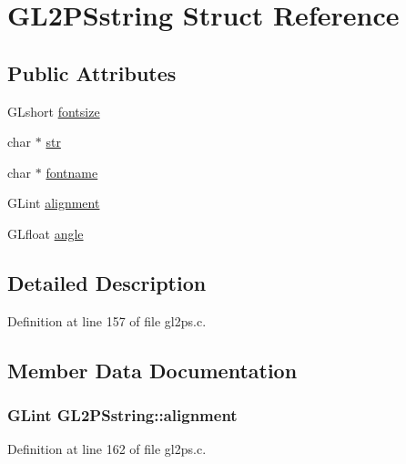 \hypertarget{struct_g_l2_p_sstring}{}\section{G\+L2\+P\+Sstring Struct Reference}
\label{struct_g_l2_p_sstring}
\subsection*{Public Attributes}
\begin{DoxyCompactItemize}
\item 
G\+Lshort \hyperlink{struct_g_l2_p_sstring_af7aa09890103ff15ddca41dd82b29b75}{fontsize}
\item 
char $\ast$ \hyperlink{struct_g_l2_p_sstring_ab4834e08f2449e695293efb4c4c9b5d2}{str}
\item 
char $\ast$ \hyperlink{struct_g_l2_p_sstring_a7afa2bce0363ec705d57e7fd4845b292}{fontname}
\item 
G\+Lint \hyperlink{struct_g_l2_p_sstring_a7fffe9c7f864eb511a381a2c8aa49fa0}{alignment}
\item 
G\+Lfloat \hyperlink{struct_g_l2_p_sstring_ac9c1f14e619dd358390e467b8999deb3}{angle}
\end{DoxyCompactItemize}


\subsection{Detailed Description}


Definition at line 157 of file gl2ps.\+c.



\subsection{Member Data Documentation}
\hypertarget{struct_g_l2_p_sstring_a7fffe9c7f864eb511a381a2c8aa49fa0}{}
\subsubsection[{alignment}]{\setlength{\rightskip}{0pt plus 5cm}G\+Lint G\+L2\+P\+Sstring\+::alignment}\label{struct_g_l2_p_sstring_a7fffe9c7f864eb511a381a2c8aa49fa0}


Definition at line 162 of file gl2ps.\+c.

\hypertarget{struct_g_l2_p_sstring_ac9c1f14e619dd358390e467b8999deb3}{}
